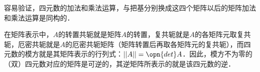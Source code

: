 容易验证，四元数的加法和乘法运算，与把基分别换成这四个矩阵以后的矩阵加法和乘法运算是同构的．

在矩阵表示中，$A$的转置共轭就是矩阵$A$的转置，复共轭就是$A$的各矩阵元取复共轭，厄密共轭就是$A$的厄密共轭矩阵（矩阵转置后再取各矩阵元的复共轭），而四元数的模方就是其矩阵表示的行列式：$||A||=\opn{det}A$．因此，模方不为零的（双）四元数对应的矩阵是可逆的，其逆矩阵所表示的就是该四元数的逆．




